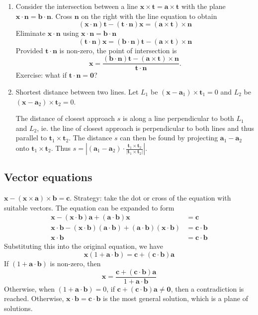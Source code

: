 \documentclass[a4paper]{article}
\begin{document}
\begin{eg}\leavevmode
  \begin{enumerate}
    \item Consider the intersection between a line $\mathbf{x\times t = a\times t}$ with the plane $\mathbf{x\cdot n = b\cdot n}$. Cross $\mathbf{n}$ on the right with the line equation to obtain
      \[
        \mathbf{(x\cdot n)t - (t\cdot n)x = (a\times t)\times n}
      \]
      Eliminate $\mathbf{x\cdot n}$ using $\mathbf{x\cdot n = b\cdot n}$
      \[
        \mathbf{(t\cdot n)x = (b\cdot n)t - (a\times t)\times n}
      \]
      Provided $\mathbf{t\cdot n}$ is non-zero, the point of intersection is
      \[
        \mathbf{x = \frac{(b\cdot n)t - (a\times t)\times n}{t\cdot n}}.
      \]
      Exercise: what if $\mathbf{t\cdot n = 0}$?
    \item Shortest distance between two lines. Let $L_1$ be $(\mathbf{x} - \mathbf{a}_1)\times \mathbf{t}_1 = 0$ and $L_2$ be $(\mathbf{x} - \mathbf{a}_2)\times \mathbf{t}_2 = 0$.

      The distance of closest approach $s$ is along a line perpendicular to both $L_1$ and $L_2$, ie. the line of closest approach is perpendicular to both lines and thus parallel to $\mathbf{t}_1\times \mathbf{t}_2$. The distance $s$ can then be found by projecting $\mathbf{a}_1 - \mathbf{a}_2$ onto $\mathbf{t}_1\times \mathbf{t}_2$. Thus $s = \left|(\mathbf{a}_1 - \mathbf{a}_2)\cdot\frac{\mathbf{t}_1\times \mathbf{t}_2}{|\mathbf{t}_1\times \mathbf{t}_2|}\right|$.
  \end{enumerate}
\end{eg}
\subsection{Vector equations}
\begin{eg}
  $\mathbf{x - (x\times a)\times b = c}$. Strategy: take the dot or cross of the equation with suitable vectors. The equation can be expanded to form
  \begin{align*}
    \mathbf{x - (x\cdot b)a + (a\cdot b)x} &= \mathbf{c}\\
    \mathbf{x\cdot b - (x\cdot b)(a\cdot b) + (a\cdot b)(x\cdot b)} &= \mathbf{c\cdot b}\\
    \mathbf{x\cdot b} &= \mathbf{c\cdot b}
  \end{align*}
  Substituting this into the original equation, we have
  \[
    \mathbf{x}(1 + \mathbf{a\cdot b}) = \mathbf{c + (c\cdot b)a}
  \]
  If $(1 + \mathbf{a \cdot b})$ is non-zero, then
  \[
    \mathbf{x} = \frac{\mathbf{c + (c\cdot b)a}}{1 + \mathbf{a\cdot b}}
  \]
  Otherwise, when $(1 + \mathbf{a\cdot b}) = 0$, if $\mathbf{c + (c\cdot b)a \not= 0}$, then a contradiction is reached. Otherwise, $\mathbf{x\cdot b = c\cdot b}$ is the most general solution, which is a plane of solutions.
\end{eg}
\end{document}
